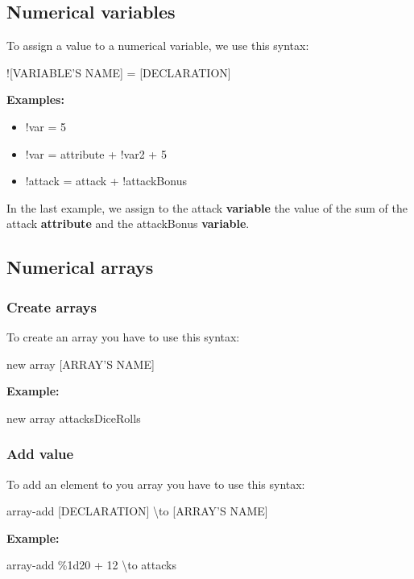 \documentclass[11pt,a4paper,openright,oneside]{book}
\newenvironment{exs}
{
  \setlength{\parindent}{0cm}
  \large \textbf{Examples:} \normalsize
}
{}
\newenvironment{ex}
{
  \setlength{\parindent}{0cm}
  \large \textbf{Example:} \normalsize 
}
{}
\begin{document}
\subsection{Numerical variables}

To assign a value to a numerical variable, we use this syntax:
\begin{center} \textsf{!\textsc{\scriptsize[VARIABLE'S NAME]} = \textsc{\scriptsize[DECLARATION]}} \normalsize \end{center}
\begin{exs}
  \begin{itemize}
    \item \textsf{!var = 5}
    \item \textsf{!var = attribute + !var2 + 5}
    \item \textsf{!attack = attack + !attackBonus}
  \end{itemize}
In the last example, we assign to the \textsf{attack \textbf{variable}} the value of the sum of the \textsf{attack \textbf{attribute}} and the \textsf{attackBonus \textbf{variable}}.
\end{exs}

\subsection{Numerical arrays}

\subsubsection{Create arrays}
To create an array you have to use this syntax:
\begin{center} \textsf{new array \textsc{\scriptsize[ARRAY'S NAME]}} \normalsize \end{center}
\begin{ex} 
  new array attacksDiceRolls
\end{ex}

\subsubsection{Add value}
To add an element to you array you have to use this syntax:
\begin{center} \textsf{array-add \textsc{\scriptsize[DECLARATION]} \textbackslash to \textsc{\scriptsize[ARRAY'S NAME]}} \normalsize \end{center}
\begin{ex} 
  \textsf{array-add \%1d20 + 12 \textbackslash to attacks}
\end{ex}
\end{document}
